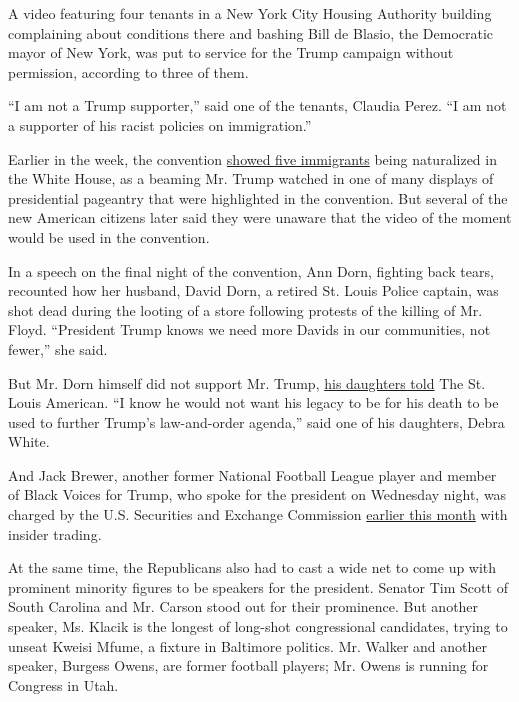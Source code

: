 A video featuring four tenants in a New York City Housing Authority
building complaining about conditions there and bashing Bill de Blasio,
the Democratic mayor of New York, was put to service for the Trump
campaign without permission, according to three of them.

``I am not a Trump supporter,'' said one of the tenants, Claudia Perez.
``I am not a supporter of his racist policies on immigration.''

Earlier in the week, the convention
\href{https://www.nytimes3xbfgragh.onion/2020/08/26/us/politics/trump-naturalization-ceremony-rnc.html}{showed
five immigrants} being naturalized in the White House, as a beaming Mr.
Trump watched in one of many displays of presidential pageantry that
were highlighted in the convention. But several of the new American
citizens later said they were unaware that the video of the moment would
be used in the convention.

In a speech on the final night of the convention, Ann Dorn, fighting
back tears, recounted how her husband, David Dorn, a retired St. Louis
Police captain, was shot dead during the looting of a store following
protests of the killing of Mr. Floyd. ``President Trump knows we need
more Davids in our communities, not fewer,'' she said.

But Mr. Dorn himself did not support Mr. Trump,
\href{http://www.stlamerican.com/news/national_news/david-dorn-s-daughters-oppose-father-s-widow-speaking-at-rnc/article_da760964-e7fe-11ea-81fd-8f15f591da91.html}{his
daughters told} The St. Louis American. ``I know he would not want his
legacy to be for his death to be used to further Trump's law-and-order
agenda,'' said one of his daughters, Debra White.

And Jack Brewer, another former National Football League player and
member of Black Voices for Trump, who spoke for the president on
Wednesday night, was charged by the U.S. Securities and Exchange
Commission
\href{https://www.npr.org/2020/08/25/905953942/rnc-speaker-facing-federal-charges-of-insider-trading}{earlier
this month} with insider trading.

At the same time, the Republicans also had to cast a wide net to come up
with prominent minority figures to be speakers for the president.
Senator Tim Scott of South Carolina and Mr. Carson stood out for their
prominence. But another speaker, Ms. Klacik is the longest of long-shot
congressional candidates, trying to unseat Kweisi Mfume, a fixture in
Baltimore politics. Mr. Walker and another speaker, Burgess Owens, are
former football players; Mr. Owens is running for Congress in Utah.

